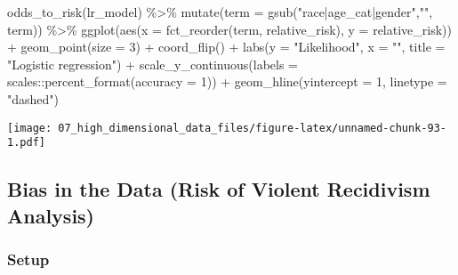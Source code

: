 \documentclass[
]{book}
\newenvironment{Shaded}{\begin{snugshade}}{\end{snugshade}}
\newcommand{\AttributeTok}[1]{\textcolor[rgb]{0.77,0.63,0.00}{#1}}
\newcommand{\DecValTok}[1]{\textcolor[rgb]{0.00,0.00,0.81}{#1}}
\newcommand{\FunctionTok}[1]{\textcolor[rgb]{0.00,0.00,0.00}{#1}}
\newcommand{\NormalTok}[1]{#1}
\newcommand{\SpecialCharTok}[1]{\textcolor[rgb]{0.00,0.00,0.00}{#1}}
\newcommand{\StringTok}[1]{\textcolor[rgb]{0.31,0.60,0.02}{#1}}
\begin{document}
\begin{Shaded}
\begin{Highlighting}[]
\FunctionTok{odds\_to\_risk}\NormalTok{(lr\_model) }\SpecialCharTok{\%\textgreater{}\%}
    \FunctionTok{mutate}\NormalTok{(}\AttributeTok{term =} \FunctionTok{gsub}\NormalTok{(}\StringTok{"race|age\_cat|gender"}\NormalTok{,}\StringTok{""}\NormalTok{, term)) }\SpecialCharTok{\%\textgreater{}\%} 
    \FunctionTok{ggplot}\NormalTok{(}\FunctionTok{aes}\NormalTok{(}\AttributeTok{x =} \FunctionTok{fct\_reorder}\NormalTok{(term, relative\_risk), }\AttributeTok{y =}\NormalTok{ relative\_risk)) }\SpecialCharTok{+}
        \FunctionTok{geom\_point}\NormalTok{(}\AttributeTok{size =} \DecValTok{3}\NormalTok{) }\SpecialCharTok{+}
        \FunctionTok{coord\_flip}\NormalTok{() }\SpecialCharTok{+}
        \FunctionTok{labs}\NormalTok{(}\AttributeTok{y =} \StringTok{"Likelihood"}\NormalTok{, }\AttributeTok{x =} \StringTok{""}\NormalTok{,}
             \AttributeTok{title =} \StringTok{"Logistic regression"}\NormalTok{) }\SpecialCharTok{+}
        \FunctionTok{scale\_y\_continuous}\NormalTok{(}\AttributeTok{labels =}\NormalTok{ scales}\SpecialCharTok{::}\FunctionTok{percent\_format}\NormalTok{(}\AttributeTok{accuracy =} \DecValTok{1}\NormalTok{)) }\SpecialCharTok{+}
        \FunctionTok{geom\_hline}\NormalTok{(}\AttributeTok{yintercept =} \DecValTok{1}\NormalTok{, }\AttributeTok{linetype =} \StringTok{"dashed"}\NormalTok{)}
\end{Highlighting}
\end{Shaded}

\texttt{[image: 07\_high\_dimensional\_data\_files/figure-latex/unnamed-chunk-93-1.pdf]}

\hypertarget{bias-in-the-data-risk-of-violent-recidivism-analysis}{%
\subsection{Bias in the Data (Risk of Violent Recidivism Analysis)}\label{bias-in-the-data-risk-of-violent-recidivism-analysis}}

\hypertarget{setup-8}{%
\subsubsection{Setup}\label{setup-8}}
\end{document}
